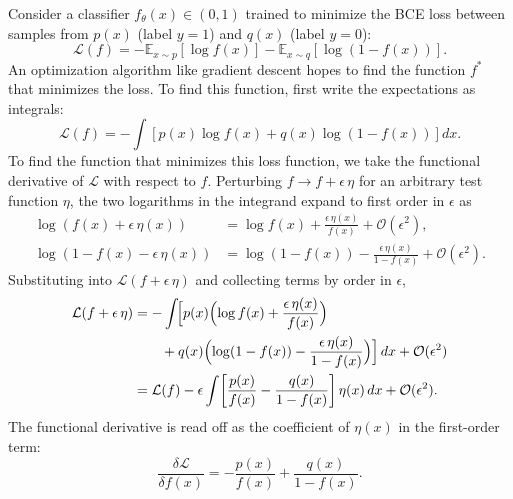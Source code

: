 Consider a classifier $f_\theta(x) \in (0,1)$ trained to minimize the BCE loss between samples from $p(x)$ (label $y=1$) and $q(x)$ (label $y=0$):
\begin{equation}
    \mathcal{L}(f) = -\mathbb{E}_{x \sim p}\!\left[\log f(x)\right]
                    -\mathbb{E}_{x \sim q}\!\left[\log(1 - f(x))\right].
    \label{eqn:bce_dre}
\end{equation}
An optimization algorithm like gradient descent hopes to find the function $f^*$ that minimizes the loss.
To find this function, first write the expectations as integrals:
\begin{equation}
    \mathcal{L}(f) = -\int \!\left[p(x)\log f(x) + q(x)\log(1-f(x))\right] dx.
    \label{eqn:bce_integral}
\end{equation}
To find the function that minimizes this loss function, we take the functional derivative of $\mathcal{L}$ with respect to $f$.
Perturbing $f \to f + \epsilon\,\eta$ for an arbitrary test function $\eta$, the two logarithms in the integrand expand to first order in $\epsilon$ as
\begin{align}
    \log\!\left(f(x) + \epsilon\,\eta(x)\right)
        &= \log f(x) + \frac{\epsilon\,\eta(x)}{f(x)} + \mathcal{O}(\epsilon^2), \label{eqn:log_expand1}\\
    \log\!\left(1 - f(x) - \epsilon\,\eta(x)\right)
        &= \log(1-f(x)) - \frac{\epsilon\,\eta(x)}{1-f(x)} + \mathcal{O}(\epsilon^2). \label{eqn:log_expand2}
\end{align}
Substituting into $\mathcal{L}(f+\epsilon\,\eta)$ and collecting terms by order in $\epsilon$,
\begin{align}
    \mathcal{L}(f + \epsilon\,\eta)
    &= -\int\!\Bigl[p(x)\Bigl(\log f(x) + \frac{\epsilon\,\eta(x)}{f(x)}\Bigr)
       \notag\\
    &\qquad + q(x)\Bigl(\log(1-f(x)) - \frac{\epsilon\,\eta(x)}{1-f(x)}\Bigr)\Bigr]\,dx
       + \mathcal{O}(\epsilon^2) \notag\\
    &= \mathcal{L}(f)
       - \epsilon\int\!\left[\frac{p(x)}{f(x)} - \frac{q(x)}{1-f(x)}\right]\eta(x)\,dx
       + \mathcal{O}(\epsilon^2).
    \label{eqn:functional_perturb}
\end{align}
The functional derivative is read off as the coefficient of $\eta(x)$ in the first-order term:
\begin{equation}
    \frac{\delta \mathcal{L}}{\delta f(x)} = -\frac{p(x)}{f(x)} + \frac{q(x)}{1-f(x)}.
    \label{eqn:functional_deriv}
\end{equation}
